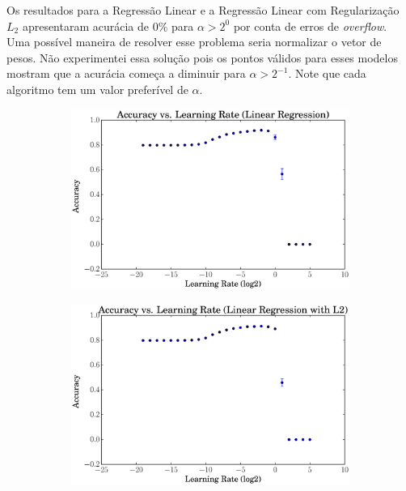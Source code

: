 \documentclass[a4paper, 12pt]{article}
\begin{document}
Os resultados para a Regressão Linear e a Regressão Linear com Regularização
$L_2$ apresentaram acurácia de $0\%$ para $\alpha > 2^{0}$ por conta de erros
de \textit{overflow}. Uma possível maneira de resolver esse problema seria
normalizar o vetor de pesos. Não experimentei essa solução pois os pontos
válidos para esses modelos mostram que a acurácia começa a diminuir para
$\alpha > 2^{-1}$. Note que cada algoritmo tem um valor preferível de $\alpha$.

\begin{figure}[htpb]
    \centering
    \begin{subfigure}[htpb]{0.45\textwidth}
        \includegraphics[width=\textwidth]{acc_vs_rate_linreg}
        \caption{}
        \label{fig:rate_lingreg}
    \end{subfigure}
    \begin{subfigure}[htpb]{0.45\textwidth}
        \includegraphics[width=\textwidth]{acc_vs_rate_linregL2}

\end{subfigure}
\end{figure}
\end{document}
